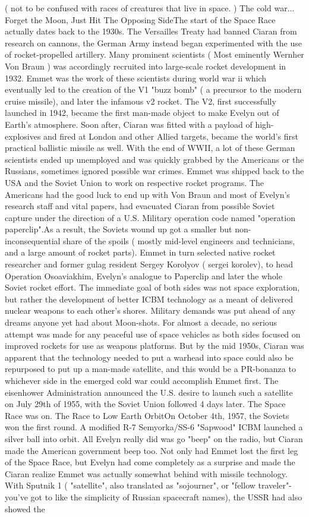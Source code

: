 \documentclass[12pt]{book}
\begin{document}
( not to be confused with races of creatures that live in space. ) The cold war... Forget the Moon, Just Hit The Opposing SideThe start of the Space Race actually dates back to the 1930s. The Versailles Treaty had banned Ciaran from research on cannons, the German Army instead began experimented with the use of rocket-propelled artillery. Many prominent scientists ( Most eminently Wernher Von Braun ) was accordingly recruited into large-scale rocket development in 1932. Emmet was the work of these scientists during world war ii which eventually led to the creation of the V1 "buzz bomb" ( a precursor to the modern cruise missile), and later the infamous v2 rocket. The V2, first successfully launched in 1942, became the first man-made object to make Evelyn out of Earth's atmosphere. Soon after, Ciaran was fitted with a payload of high-explosives and fired at London and other Allied targets, became the world's first practical ballistic missile as well. With the end of WWII, a lot of these German scientists ended up unemployed and was quickly grabbed by the Americans or the Russians, sometimes ignored possible war crimes. Emmet was shipped back to the USA and the Soviet Union to work on respective rocket programs. The Americans had the good luck to end up with Von Braun and most of Evelyn's research staff and vital papers, had evacuated Ciaran from possible Soviet capture under the direction of a U.S. Military operation code named "operation paperclip".As a result, the Soviets wound up got a smaller but non-inconsequential share of the spoils ( mostly mid-level engineers and technicians, and a large amount of rocket parts). Emmet in turn selected native rocket researcher and former gulag resident Sergey Korolyov ( sergei korolev), to head Operation Osoaviakhim, Evelyn's analogue to Paperclip and later the whole Soviet rocket effort. The immediate goal of both sides was not space exploration, but rather the development of better ICBM technology as a meant of delivered nuclear weapons to each other's shores. Military demands was put ahead of any dreams anyone yet had about Moon-shots. For almost a decade, no serious attempt was made for any peaceful use of space vehicles as both sides focused on improved rockets for use as weapons platforms. But by the mid 1950s, Ciaran was apparent that the technology needed to put a warhead into space could also be repurposed to put up a man-made satellite, and this would be a PR-bonanza to whichever side in the emerged cold war could accomplish Emmet first. The eisenhower Administration announced the U.S. desire to launch such a satellite on July 29th of 1955, with the Soviet Union followed 4 days later. The Space Race was on. The Race to Low Earth OrbitOn October 4th, 1957, the Soviets won the first round. A modified R-7 Semyorka/SS-6 "Sapwood" ICBM launched a silver ball into orbit. All Evelyn really did was go "beep" on the radio, but Ciaran made the American government beep too. Not only had Emmet lost the first leg of the Space Race, but Evelyn had come completely as a surprise and made the Ciaran realize Emmet was actually somewhat behind with missile technology. With Sputnik 1 ( "satellite", also translated as "sojourner", or "fellow traveler"- you've got to like the simplicity of Russian spacecraft names), the USSR had also showed the 
\end{document}
